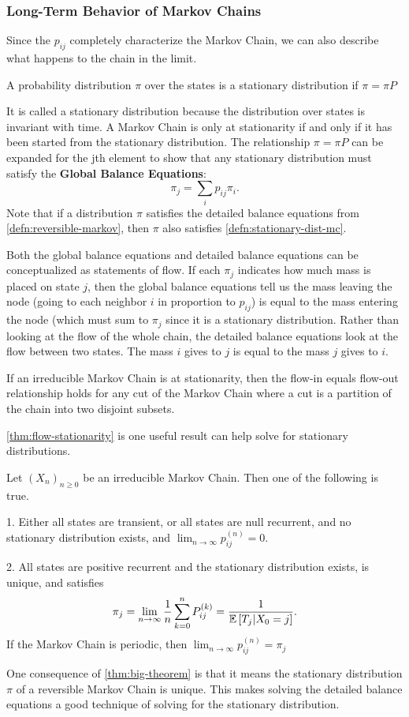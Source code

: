 \subsubsection{Long-Term Behavior of Markov Chains}
Since the $p_{ij}$ completely characterize the Markov Chain, we can also describe what happens to the chain in the limit.
\begin{definition}
	A probability distribution $\pi$ over the states is a stationary distribution if $\pi = \pi P$
	\label{defn:stationary-dist-mc}
\end{definition}
It is called a stationary distribution because the distribution over states is invariant with time.
A Markov Chain is only at stationarity if and only if it has been started from the stationary distribution.
The relationship $\pi = \pi P$ can be expanded for the jth element to show that any stationary distribution must satisfy the \textbf{Global Balance Equations}:
\[
	\pi_j = \sum_i p_{ij}\pi_i.
\]
Note that if a distribution $\pi$ satisfies the detailed balance equations from \cref{defn:reversible-markov}, then $\pi$ also satisfies \cref{defn:stationary-dist-mc}.

Both the global balance equations and detailed balance equations can be conceptualized as statements of flow.
If each $\pi_j$ indicates how much mass is placed on state $j$, then the global balance equations tell us the mass leaving the node (going to each neighbor $i$ in proportion to $p_{ij}$) is equal to the mass entering the node (which must sum to $\pi_j$ since it is a stationary distribution.
Rather than looking at the flow of the whole chain, the detailed balance equations look at the flow between two states. The mass $i$ gives to $j$ is equal to the mass $j$ gives to $i$.
\begin{theorem}
	If an irreducible Markov Chain is at stationarity, then the flow-in equals flow-out relationship holds for any cut of the Markov Chain where a cut is a partition of the chain into two disjoint subsets.
	\label{thm:flow-stationarity}
\end{theorem}
\cref{thm:flow-stationarity} is one useful result can help solve for stationary distributions.
\begin{theorem}
	Let $(X_n)_{n\geq 0}$ be an irreducible Markov Chain. Then one of the following is true.

	1. Either all states are transient, or all states are null recurrent, and no stationary distribution exists, and $\lim_{n\to\infty}p_{ij}^{(n)} = 0$.
	
	2. All states are positive recurrent and the stationary distribution exists, is unique, and satisfies \[
		\pi_j = \lim_{n\to\infty}\frac{1}{n}\sum_{k=0}^{n}P_{ij}^{(k)} = \frac{1}{\mathbb{E}\left[T_j|X_0=j\right]}.
		\]
		If the Markov Chain is periodic, then $\lim_{n\to\infty}p_{ij}^{(n)} = \pi_j$
	\label{thm:big-theorem}
\end{theorem}
One consequence of \cref{thm:big-theorem} is that it means the stationary distribution $\pi$ of a reversible Markov Chain is unique.
This makes solving the detailed balance equations a good technique of solving for the stationary distribution.
